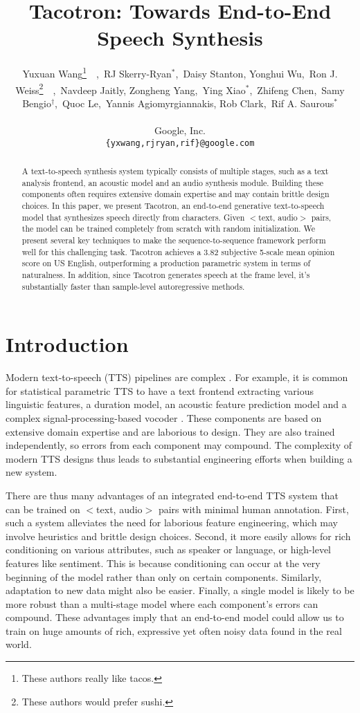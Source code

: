 \documentclass{article} \usepackage{iclr2017_conference,times}
\title{Tacotron: Towards End-to-End Speech Synthesis}
\author{Yuxuan Wang\thanks{ These authors really like tacos.}~~,~RJ Skerry-Ryan$^\ast$,~Daisy Stanton, Yonghui Wu,~Ron J. Weiss\thanks{ These authors would prefer sushi.}~~,~Navdeep Jaitly, \And
Zongheng Yang,~Ying Xiao$^\ast$,~Zhifeng Chen,~Samy Bengio$^\dagger$,~Quoc Le,~Yannis Agiomyrgiannakis,\And
Rob Clark,~Rif A. Saurous$^\ast$
\\
\\
Google, Inc.\\
\texttt{\{yxwang,rjryan,rif\}@google.com}
}
\begin{document}
\maketitle

\begin{abstract}
A text-to-speech synthesis system typically consists of multiple stages, such as a text analysis frontend, an acoustic model and an audio synthesis module. Building these components often requires extensive domain expertise and may contain brittle design choices. In this paper, we present Tacotron, an end-to-end generative text-to-speech model that synthesizes speech directly from characters. Given $<$text, audio$>$ pairs, the model can be trained completely from scratch with random initialization. We present several key techniques to make the sequence-to-sequence framework perform well for this challenging task. Tacotron achieves a 3.82 subjective 5-scale mean opinion score on US English, outperforming a production parametric system in terms of naturalness. In addition, since Tacotron generates speech at the frame level, it's substantially faster than sample-level autoregressive methods.
\end{abstract}

\section{Introduction}
Modern text-to-speech (TTS) pipelines are complex \citep{taylor2009text}. For example, it is common for statistical parametric TTS to have a text frontend extracting various linguistic features, a duration model, an acoustic feature prediction model and a complex signal-processing-based vocoder \citep{zen2009statistical,agiomyrgiannakis2015vocaine}. These components are based on extensive domain expertise and are laborious to design. They are also trained independently, so errors from each component may compound. The complexity of modern TTS designs thus leads to substantial engineering efforts when building a new system.


There are thus many advantages of an integrated end-to-end TTS system that can be trained on $<$text, audio$>$ pairs with minimal human annotation. First, such a system alleviates the need for laborious feature engineering, which may involve heuristics and brittle design choices. Second, it more easily allows for rich conditioning on various attributes, such as speaker or language, or high-level features like sentiment. This is because conditioning can occur at the very beginning of the model rather than only on certain components. Similarly, adaptation to new data might also be easier. Finally, a single model is likely to be more robust than a multi-stage model where each component's errors can compound. These advantages imply that an end-to-end model could allow us to train on huge amounts of rich, expressive yet often noisy data found in the real world.
\end{document}
